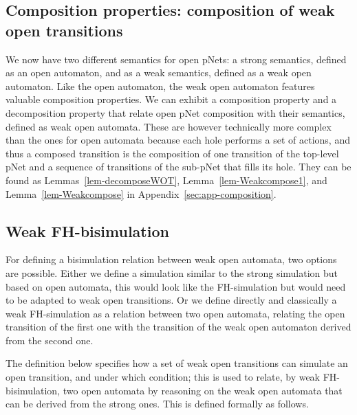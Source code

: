 \documentclass{lmcs}
\begin{document}
\subsection{Composition properties: composition of weak open transitions}
We now have two different semantics for open pNets: a strong semantics, defined  as an open automaton, and as a weak semantics, defined as a weak open automaton. Like the open automaton, the weak open automaton features valuable composition properties. We can exhibit  a composition property and a decomposition property that relate open pNet composition with their semantics, defined as weak open automata. These are however technically more complex than the ones for open automata because each hole performs a set of actions, and thus a composed transition is the composition of one transition of the top-level pNet and a sequence of transitions of the sub-pNet that fills its hole. They can be found as Lemmas~\ref{lem-decomposeWOT}, Lemma~\ref{lem-Weakcompose1}, and Lemma~\ref{lem-Weakcompose} in Appendix~\ref{sec:app-composition}.



\subsection{Weak FH-bisimulation}
For defining a bisimulation relation between weak open automata, two options are possible. Either we define a simulation similar to the strong simulation but based on open automata, this would look like the FH-simulation but would need to be adapted to weak open transitions. Or we define directly and classically a weak FH-simulation as a relation between two open automata, relating the open transition of the first one with the transition of the weak open automaton derived from the second one. 

The definition below specifies how a set of weak open transitions can simulate an open transition, and under which condition; this is used to relate, by weak FH-bisimulation, two open automata by reasoning on the weak open automata that can be derived from the strong ones.
This is defined formally as follows.
\end{document}
